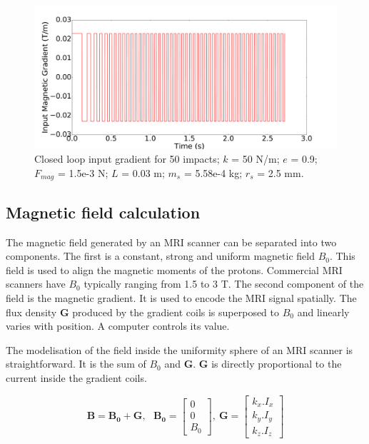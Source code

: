 \documentclass[letterpaper, 10 pt, conference]{ieeeconf}  %
\begin{document}
\begin{figure}
	\includegraphics[width=\linewidth]{CLinput.pdf}
	\caption{Closed loop input gradient for 50 impacts; $k$ = 50 N/m; $e$ = 0.9; $F_{mag}$ = 1.5e-3 N; $L$ = 0.03 m; $m_s$ = 5.58e-4 kg; $r_s$ = 2.5 mm.}
\label{CLinput}
	
\end{figure}

\subsection{Magnetic field calculation}

The magnetic field generated by an MRI scanner can be separated into two components. The first is a constant, strong and uniform magnetic field $B_0$. This field is used to align the magnetic moments of the protons. Commercial MRI scanners have $B_0$ typically ranging from 1.5 to 3 T. The second component of the field is the magnetic gradient. It is used to encode the MRI signal spatially. The flux density $\mathbf{G}$ produced by the gradient coils is superposed to $B_0$ and linearly varies with position. A computer controls its value.\par
The modelisation of the field inside the uniformity sphere of an MRI scanner is straightforward. It is the sum of $B_0$ and $\mathbf{G}$. $\mathbf{G}$ is directly proportional to the current inside the gradient coils. 

\begin{equation}
\mathbf{B}=\mathbf{B_0}+\mathbf{G},~~~
\mathbf{B_0}=\begin{bmatrix}
0\\ 
0\\ 
B_0
\end{bmatrix},~
\mathbf{G}=\begin{bmatrix}
k_x.I_x\\ 
k_y.I_y\\ 
k_z.I_z
\end{bmatrix}
\label{magfield}
\end{equation}
\end{document}
